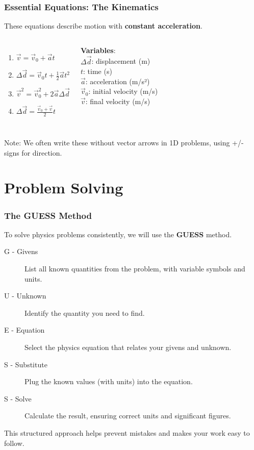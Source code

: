 \documentclass{beamer}
\begin{document}
\begin{frame}
\frametitle{Essential Equations: The Kinematics}
These equations describe motion with \textbf{constant acceleration}.
\begin{columns}
\begin{enumerate}
    \item $\vec{v} = \vec{v}_0 + \vec{a}t$
    \item $\Delta\vec{d} = \vec{v}_0 t + \frac{1}{2}\vec{a}t^2$
    \item $\vec{v}^2 = \vec{v}_0^2 + 2\vec{a}\Delta\vec{d}$
    \item $\Delta\vec{d} = \frac{\vec{v}_0 + \vec{v}}{2} t$
\end{enumerate}
\textbf{Variables}:\\
$\Delta\vec{d}$: displacement (m)\\
$t$: time (s)\\
$\vec{a}$: acceleration (m/s²)\\
$\vec{v}_0$: initial velocity (m/s)\\
$\vec{v}$: final velocity (m/s)
\end{columns}
\vspace{1em}
\alert{Note:} We often write these without vector arrows in 1D problems, using +/- signs for direction.
\end{frame}

\section{Problem Solving}

\begin{frame}
\frametitle{The GUESS Method}
To solve physics problems consistently, we will use the \textbf{GUESS} method.
\begin{description}
    \item[\alert{G} - Givens] List all known quantities from the problem, with variable symbols and units.
    \item[\alert{U} - Unknown] Identify the quantity you need to find.
    \item[\alert{E} - Equation] Select the physics equation that relates your givens and unknown.
    \item[\alert{S} - Substitute] Plug the known values (with units) into the equation.
    \item[\alert{S} - Solve] Calculate the result, ensuring correct units and significant figures.
\end{description}
This structured approach helps prevent mistakes and makes your work easy to follow.
\end{frame}
\end{document}
